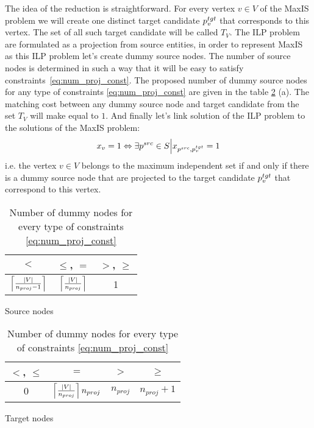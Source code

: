 The idea of the reduction is straightforward. For every vertex \( v \in V \) of the MaxIS problem
we will create one distinct target candidate \( p_v^{tgt} \) that corresponds to this vertex.
The set of all such target candidate will be called \( T_V \). The ILP problem are formulated as a projection
from source entities, in order to represent MaxIS as this ILP problem let's create dummy source nodes. The number of source nodes
is determined in such a way that it will be easy to satisfy constraints~\eqref{eq:num_proj_const}.
The proposed number of dummy source nodes for any type of constraints \eqref{eq:num_proj_const} are given
in the table \ref{tab:dummy_nodes_num} (a). The matching cost between any dummy source node and
target candidate from the set \( T_V \) will make equal to \( 1 \). And finally let's link solution of the
ILP problem to the solutions of the MaxIS problem:
\[
    x_v = 1 \Leftrightarrow \exists p^{src} \in S \Big| x_{p^{src}, p_v^{tgt}} = 1
\]
i.e. the vertex \( v \in V \) belongs to the maximum independent set if and only if there is a dummy
source node that are projected to the target candidate \( p_v^{tgt} \) that correspond to this vertex.

\begin{table}[h]
    \begin{subtable}[t]{0.5\linewidth}
        \centering
        \renewcommand{\arraystretch}{1.5}
        \begin{tabular}{|c|c|c|}
            \hline
            \(<\)                                 & \( \leq \), \( = \)               & \(>\), \( \geq \) \\
            \hline
            \( \left\lceil \frac{|V|}{n_{proj} - 1} \right\rceil \) & \( \left\lceil \frac{|V|}{n_{proj}} \right\rceil \) & 1                 \\
            \hline
        \end{tabular}
        \caption{Source nodes}
        \label{tab:src_dummy_nodes_num}
    \end{subtable}
    \begin{subtable}[t]{0.5\linewidth}
        \centering
        \renewcommand{\arraystretch}{1.5}
        \begin{tabular}{|c|c|c|c|}
            \hline
            \(<\), \(\leq\) & \( = \)                                    & \(>\)          & \( \geq \)         \\
            \hline
            \( 0 \)         & \( \left\lceil \frac{|V|}{n_{proj}} \right\rceil n_{proj} \) & \( n_{proj} \) & \( n_{proj} + 1 \) \\
            \hline
        \end{tabular}
        \caption{Target nodes}
        \label{tab:tgt_dummy_nodes_num}
    \end{subtable}
    \caption{Number of dummy nodes for every type of constraints \eqref{eq:num_proj_const}}
    \label{tab:dummy_nodes_num}
\end{table}

